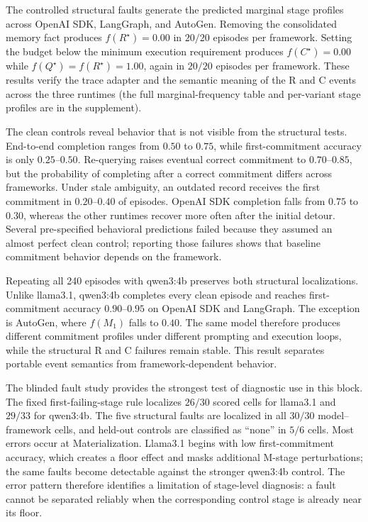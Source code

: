 \documentclass[letterpaper]{article} %
\begin{document}
The controlled structural faults generate the predicted marginal stage profiles across OpenAI SDK, LangGraph, and AutoGen. Removing the consolidated memory fact produces $f(R^\star)=0.00$ in $20/20$ episodes per framework. Setting the budget below the minimum execution requirement produces $f(C^\star)=0.00$ while $f(Q^\star)=f(R^\star)=1.00$, again in $20/20$ episodes per framework. These results verify the trace adapter and the semantic meaning of the R and C events across the three runtimes (the full marginal-frequency table and per-variant stage profiles are in the supplement).

The clean controls reveal behavior that is not visible from the structural tests. End-to-end completion ranges from $0.50$ to $0.75$, while first-commitment accuracy is only $0.25$--$0.50$. Re-querying raises eventual correct commitment to $0.70$--$0.85$, but the probability of completing after a correct commitment differs across frameworks. Under stale ambiguity, an outdated record receives the first commitment in $0.20$--$0.40$ of episodes. OpenAI SDK completion falls from $0.75$ to $0.30$, whereas the other runtimes recover more often after the initial detour. Several pre-specified behavioral predictions failed because they assumed an almost perfect clean control; reporting those failures shows that baseline commitment behavior depends on the framework.

Repeating all 240 episodes with qwen3:4b preserves both structural localizations. Unlike llama3.1, qwen3:4b completes every clean episode and reaches first-commitment accuracy $0.90$--$0.95$ on OpenAI SDK and LangGraph. The exception is AutoGen, where $f(M_1)$ falls to $0.40$. The same model therefore produces different commitment profiles under different prompting and execution loops, while the structural R and C failures remain stable. This result separates portable event semantics from framework-dependent behavior.

The blinded fault study provides the strongest test of diagnostic use in this block. The fixed first-failing-stage rule localizes $26/30$ scored cells for llama3.1 and $29/33$ for qwen3:4b. The five structural faults are localized in all $30/30$ model--framework cells, and held-out controls are classified as ``none'' in $5/6$ cells. Most errors occur at Materialization. Llama3.1 begins with low first-commitment accuracy, which creates a floor effect and masks additional M-stage perturbations; the same faults become detectable against the stronger qwen3:4b control. The error pattern therefore identifies a limitation of stage-level diagnosis: a fault cannot be separated reliably when the corresponding control stage is already near its floor.
\end{document}
